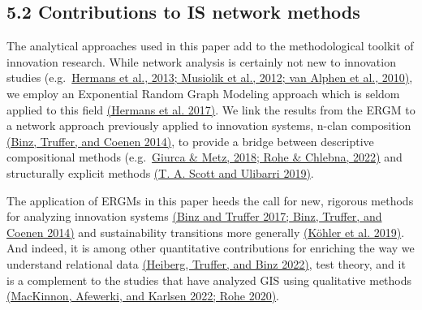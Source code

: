 \documentclass[twoside,12pt,final]{ucthesis-CA2012}
\begin{document}
\begin{ucmainmatter}
\hypertarget{contributions-to-is-network-methods}{%
\subsection{5.2 Contributions to IS network methods}\label{contributions-to-is-network-methods}}

The analytical approaches used in this paper add to the methodological
toolkit of innovation research. While network analysis is certainly not
new to innovation studies (e.g.~\href{https://www.zotero.org/google-docs/?xjueZV}{Hermans et al., 2013; Musiolik et al.,
2012; van Alphen et al.,
2010)}, we employ an
Exponential Random Graph Modeling approach which is seldom applied to
this field \href{https://www.zotero.org/google-docs/?cGdfq2}{(Hermans et al.
2017)}. We link the results
from the ERGM to a network approach previously applied to innovation
systems, n-clan composition \href{https://www.zotero.org/google-docs/?BoUMIa}{(Binz, Truffer, and Coenen
2014)}, to provide a bridge
between descriptive compositional methods (e.g.~\href{https://www.zotero.org/google-docs/?b7I4yw}{Giurca \& Metz, 2018;
Rohe \& Chlebna, 2022)} and
structurally explicit methods \href{https://www.zotero.org/google-docs/?8Oqnqu}{(T. A. Scott and Ulibarri
2019)}.

The application of ERGMs in this paper heeds the call for new, rigorous
methods for analyzing innovation systems \href{https://www.zotero.org/google-docs/?ySD6x6}{(Binz and Truffer 2017; Binz,
Truffer, and Coenen 2014)}
and sustainability transitions more generally \href{https://www.zotero.org/google-docs/?dVEBjP}{(Köhler et al.
2019)}. And indeed, it is
among other quantitative contributions for enriching the way we
understand relational data \href{https://www.zotero.org/google-docs/?MNnLbv}{(Heiberg, Truffer, and Binz
2022)}, test theory, and it
is a complement to the studies that have analyzed GIS using qualitative
methods \href{https://www.zotero.org/google-docs/?0LktGD}{(MacKinnon, Afewerki, and Karlsen 2022; Rohe
2020)}.

\hypertarget{limitations}{%
}
\end{ucmainmatter}
\end{document}
